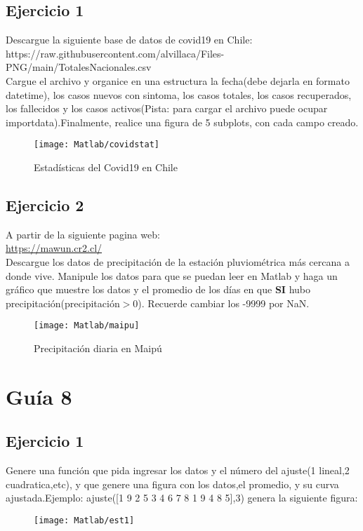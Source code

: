 \subsection{Ejercicio 1}
Descargue la siguiente base de datos de covid19 en Chile:\\
https://raw.githubusercontent.com/alvillaca/Files-PNG/main/TotalesNacionales.csv\\
Cargue el archivo y organice en una estructura la fecha(debe dejarla en formato datetime), los casos nuevos con sintoma, los casos totales, los casos recuperados, los fallecidos y los casos activos(Pista: para cargar el archivo puede ocupar importdata).Finalmente, realice una figura de 5 subplots, con cada campo creado. 
\begin{figure}[h]
	\texttt{[image: Matlab/covidstat]}
	\caption{Estadísticas del Covid19 en Chile}
	\label{fig:covidstat}
\end{figure}
\newpage

\subsection{Ejercicio 2}

A partir de la siguiente pagina web:\\
\url{https://mawun.cr2.cl/}\\
Descargue los datos de precipitación de la estación pluviométrica más cercana a donde vive.
Manipule los datos para que se puedan leer en Matlab y haga un gráfico que muestre los datos y el promedio de los días en que \textbf{SI} hubo precipitación(precipitación$>0$). Recuerde cambiar los -9999 por NaN.\par
\begin{figure}[h]
	\centering
	\texttt{[image: Matlab/maipu]}
	\caption{Precipitación diaria en Maipú}
	\label{fig:maipu}
\end{figure}
\newpage
\section{Guía 8}
\subsection{Ejercicio 1}
Genere una función que pida ingresar los datos y el número del ajuste(1 lineal,2 cuadratica,etc), y que genere una figura con los datos,el promedio, y su curva ajustada.Ejemplo: ajuste([1 9 2 5 3 4 6 7 8 1 9 4 8 5],3) genera la siguiente figura:\par
\begin{figure}[h]
	\centering
	\texttt{[image: Matlab/est1]}
	\caption{}
	\label{fig:est1}
\end{figure}
\newpage
